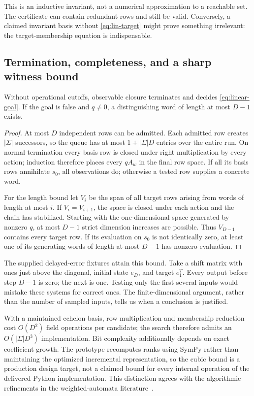 This is an inductive invariant, not a numerical approximation to a reachable
set. The certificate can contain redundant rows and still be valid. Conversely,
a claimed invariant basis without \eqref{eq:lin-target} might prove something
irrelevant: the target-membership equation is indispensable.

\subsection{Termination, completeness, and a sharp witness bound}

\begin{theorem}\label{thm:linear-complete}
Without operational cutoffs, observable closure terminates and decides
\eqref{eq:linear-goal}. If the goal is false and $q\ne0$, a distinguishing word
of length at most $D-1$ exists.
\end{theorem}
\begin{proof}
At most $D$ independent rows can be admitted. Each admitted row creates
$|\Sigma|$ successors, so the queue has at most $1+|\Sigma|D$ entries over the
entire run. On normal termination every basis row is closed under right
multiplication by every action; induction therefore places every $qA_w$ in the
final row space. If all its basis rows annihilate $s_0$, all observations do;
otherwise a tested row supplies a concrete word.

For the length bound let $V_i$ be the span of all target rows arising from words
of length at most $i$. If $V_i=V_{i+1}$, the space is closed under each action
and the chain has stabilized. Starting with the one-dimensional space generated
by nonzero $q$, at most $D-1$ strict dimension increases are possible. Thus
$V_{D-1}$ contains every target row. If its evaluation on $s_0$ is not identically
zero, at least one of its generating words of length at most $D-1$ has nonzero
evaluation.
\end{proof}

The supplied delayed-error fixtures attain this bound. Take a shift matrix with
ones just above the diagonal, initial state $e_D$, and target $e_1^T$. Every
output before step $D-1$ is zero; the next is one. Testing only the first several
inputs would mistake these systems for correct ones. The finite-dimensional
argument, rather than the number of sampled inputs, tells us when a conclusion
is justified.

With a maintained echelon basis, row multiplication and membership reduction
cost $O(D^2)$ field operations per candidate; the search therefore admits an
$O(|\Sigma|D^3)$ implementation. Bit complexity additionally depends on exact
coefficient growth. The prototype recomputes ranks using SymPy rather than
maintaining the optimized incremental representation, so the cubic bound is a
production design target, not a claimed bound for every internal operation of
the delivered Python implementation. This distinction agrees with the
algorithmic refinements in the weighted-automata literature~\cite{kiefer}.

